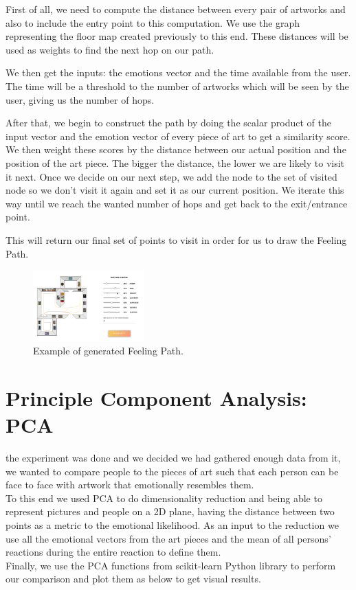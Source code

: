 \documentclass[journal, a4paper]{IEEEtran}
\begin{document}
First of all, we need to compute the distance between every pair of artworks and also to include the entry point to this computation. We use the graph representing the floor map created previously to this end. These distances will be used as weights to find the next hop on our path.

We then get the inputs: the emotions vector and the time available from the user. The time will be a threshold to the number of artworks which will be seen by the user, giving us the number of hops.

After that, we begin to construct the path by doing the scalar product of the input vector and the emotion vector of every piece of art to get a similarity score. We then weight these scores by the distance between our actual position and the position of the art piece. The bigger the distance, the lower we are likely to visit it next. Once we decide on our next step, we add the node to the set of visited node so we don't visit it again and set it as our current position. We iterate this way until we reach the wanted number of hops and get back to the exit/entrance point.

This will return our final set of points to visit in order for us to draw the Feeling Path.
\\

\begin{figure}[!h]
  \centering
    \includegraphics[width=0.38\textwidth]{patherino.jpg}
  \caption{Example of generated Feeling Path.}
  \label{fig:pathToMap}
\end{figure}

\section{Principle Component Analysis: PCA}
 the experiment was done and we decided we had gathered enough data from it, we wanted to compare people to the pieces of art such that each person can be face to face with artwork that emotionally resembles them.\\
To this end we used PCA to do dimensionality reduction and being able to represent pictures and people on a 2D plane, having the distance between two points as a metric to the emotional likelihood. As an input to the reduction we use all the emotional vectors from the art pieces and the mean of all persons' reactions during the entire reaction to define them.\\
Finally, we use the PCA functions from scikit-learn Python library to perform our comparison and plot them as below to get visual results.\\
\end{document}
